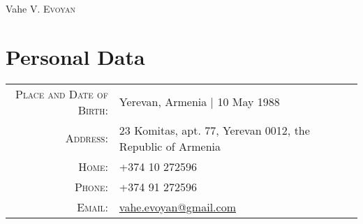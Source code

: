 \documentclass[a4paper,10pt]{article}
\begin{document}
\pagestyle{empty} %

\par{\centering
		{\Huge Vahe V. \textsc{Evoyan}
	}\bigskip\par}

\section{Personal Data}

\begin{tabular}{rl}
    \textsc{Place and Date of Birth:} & Yerevan, Armenia | 10 May 1988 \\
    \textsc{Address:}   & 23 Komitas, apt. 77, Yerevan 0012, the Republic of Armenia \\
    \textsc{Home:}      & +374 10 272596\\
    \textsc{Phone:}     & +374 91 272596\\
    \textsc{Email:}     &\href{mailto:vahe.evoyan@gmail.com}
    							{vahe.evoyan@gmail.com}
\end{tabular}

\end{document}
